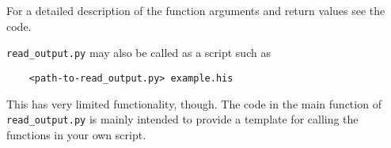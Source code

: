 \bigskip
For a detailed description of the function arguments and return values see the
code.

\texttt{read\_output.py} may also be called as a script such as
%
\begin{verbatim}
    <path-to-read_output.py> example.his
\end{verbatim}
%
This has very limited functionality, though. The code in the main function of
\texttt{read\_output.py} is mainly intended to provide a template for calling
the functions in your own script.


